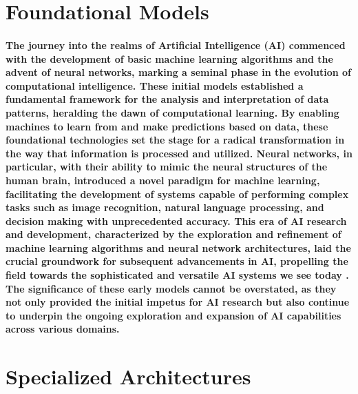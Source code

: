 \documentclass[11pt,a4paper,oneside]{report}
\begin{document}
\section{Foundational Models}
\paragraph{The journey into the realms of Artificial Intelligence (AI) commenced with the development of basic machine learning algorithms and the advent of neural networks, marking a seminal phase in the evolution of computational intelligence. These initial models established a fundamental framework for the analysis and interpretation of data patterns, heralding the dawn of computational learning. By enabling machines to learn from and make predictions based on data, these foundational technologies set the stage for a radical transformation in the way that information is processed and utilized. Neural networks, in particular, with their ability to mimic the neural structures of the human brain, introduced a novel paradigm for machine learning, facilitating the development of systems capable of performing complex tasks such as image recognition, natural language processing, and decision making with unprecedented accuracy. This era of AI research and development, characterized by the exploration and refinement of machine learning algorithms and neural network architectures, laid the crucial groundwork for subsequent advancements in AI, propelling the field towards the sophisticated and versatile AI systems we see today \cite{huang2022large}. The significance of these early models cannot be overstated, as they not only provided the initial impetus for AI research but also continue to underpin the ongoing exploration and expansion of AI capabilities across various domains.}

\section{Specialized Architectures}
\end{document}
